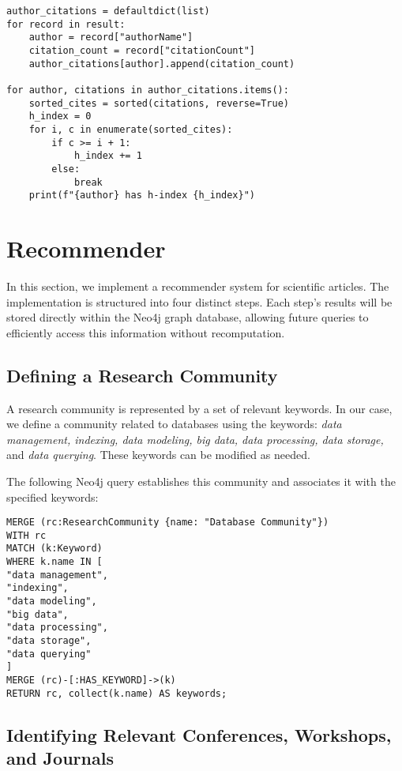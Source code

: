 \documentclass{article}
\begin{document}
\begin{verbatim}
author_citations = defaultdict(list)
for record in result:
    author = record["authorName"]
    citation_count = record["citationCount"]
    author_citations[author].append(citation_count)

for author, citations in author_citations.items():
    sorted_cites = sorted(citations, reverse=True)
    h_index = 0
    for i, c in enumerate(sorted_cites):
        if c >= i + 1:
            h_index += 1
        else:
            break
    print(f"{author} has h-index {h_index}")
\end{verbatim}

\section{Recommender}

In this section, we implement a recommender system for scientific articles. The implementation is structured into four distinct steps. Each step's results will be stored directly within the Neo4j graph database, allowing future queries to efficiently access this information without recomputation.

\subsection{Defining a Research Community}

A research community is represented by a set of relevant keywords. In our case, we define a community related to databases using the keywords: \textit{data management, indexing, data modeling, big data, data processing, data storage,} and \textit{data querying}. These keywords can be modified as needed.

The following Neo4j query establishes this community and associates it with the specified keywords:

\begin{verbatim}
MERGE (rc:ResearchCommunity {name: "Database Community"})
WITH rc
MATCH (k:Keyword)
WHERE k.name IN [
"data management",
"indexing",
"data modeling",
"big data",
"data processing",
"data storage",
"data querying"
]
MERGE (rc)-[:HAS_KEYWORD]->(k)
RETURN rc, collect(k.name) AS keywords;
\end{verbatim}

\subsection{Identifying Relevant Conferences, Workshops, and Journals}
\end{document}

